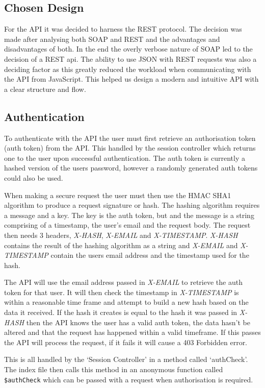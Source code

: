 \documentclass[11pt,a4paper]{report}
\begin{document}
\subsection{Chosen Design}
For the API it was decided to harness the REST protocol. The decision was made after analysing both SOAP and REST and the advantages and disadvantages of both. In the end the overly verbose nature of SOAP led to the decision of a REST api.  The ability to use JSON with REST requests was also a deciding factor as this greatly reduced the workload when communicating with the API from JavaScript. This helped us design a modern and intuitive API with a clear structure and flow. 

\subsection{Authentication}
\label{sec:authDesign}

To authenticate with the API the user must first retrieve an authorisation token (auth token) from the API. This handled by the session controller which returns one to the user upon successful authentication. The auth token is currently a hashed version of the users password, however a randomly generated auth tokens could also be used.

When making a secure request the user must then use the HMAC SHA1 algorithm to produce a request signature or hash. The hashing algorithm requires a message and a key. The key is the auth token, but and the message is a string comprising of a timestamp, the user's email and the request body. The request then needs 3 headers, \emph{X-HASH}, \emph{X-EMAIL} and \emph{X-TIMESTAMP}. \emph{X-HASH} contains the result of the hashing algorithm as a string and \emph{X-EMAIL} and \emph{X-TIMESTAMP} contain the users email address and the timestamp used for the hash.

The API will use the email address passed in \emph{X-EMAIL} to retrieve the auth token for that user. It will then check the timestamp in \emph{X-TIMESTAMP} is within a reasonable time frame and attempt to build a new hash based on the data it received. If the hash it creates is equal to the hash it was passed in \emph{X-HASH} then the API knows the user has a valid auth token, the data hasn't be altered and that the request has happened within a valid timeframe. If this passes the API will process the request, if it fails it will cause a 403 Forbidden error. 

This is all handled by the `Session Controller' in a method called `authCheck'. The index file then calls this method in an anonymous function called \lstinline{$authCheck} which can be passed with a request when authorisation is required.
\end{document}

